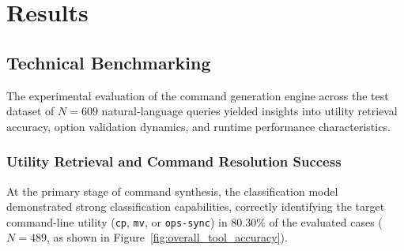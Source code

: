 \section{Results}

\subsection{Technical Benchmarking}
\FloatBarrier

The experimental evaluation of the command generation engine across the test dataset of $N=609$ natural-language queries yielded insights into utility retrieval accuracy, option validation dynamics, and runtime performance characteristics.

\subsubsection{Utility Retrieval and Command Resolution Success}
At the primary stage of command synthesis, the classification model demonstrated strong classification capabilities, correctly identifying the target command-line utility (\texttt{cp}, \texttt{mv}, or \texttt{ops-sync}) in 80.30\% of the evaluated cases ($N=489$, as shown in Figure~\ref{fig:overall_tool_accuracy}). 

